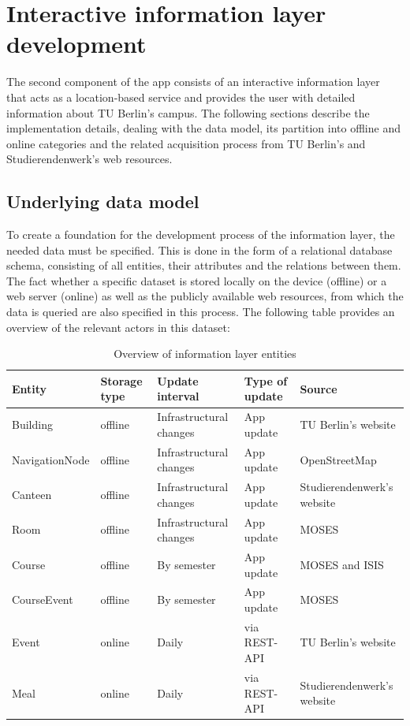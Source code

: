 \section{Interactive information layer development}
The second component of the app consists of an interactive information layer that acts as a location-based service and provides the user with detailed information about TU Berlin's campus. The following sections describe the implementation details, dealing with the data model, its partition into offline and online categories and the related acquisition process from TU Berlin's and Studierendenwerk's web resources. 

\subsection{Underlying data model}
To create a foundation for the development process of the information layer, the needed data must be specified. This is done in the form of a relational database schema, consisting of all entities, their attributes and the relations between them. The fact whether a specific dataset is stored locally on the device (offline) or a web server (online) as well as the publicly available web resources, from which the data is queried are also specified in this process. The following table provides an overview of the relevant actors in this dataset:

\begin{table}[!ht]
	\small
	\centering
	\begin{tabular}{|p{3cm}|p{1cm}|p{3.5cm}|p{2cm}|p{3.5cm}|}
		\hline
		\textbf{Entity}         & \textbf{Storage type} & \textbf{Update interval}      & \textbf{Type of update} 	& \textbf{Source}					 \\
		\hline
		Building	            & offline	            & Infrastructural changes       & App update 		& TU Berlin's website		 \\
		\hline
        NavigationNode          & offline	            & Infrastructural changes       & App update 		& OpenStreetMap  			 \\
		\hline
        Canteen                 & offline              	& Infrastructural changes       & App update 	    & Studierendenwerk's website \\
		\hline
		Room               		& offline              	& Infrastructural changes       & App update 		& MOSES			      		 \\
		\hline
		Course				    & offline              	& By semester                   & App update 		& MOSES	and ISIS		     \\
		\hline
		CourseEvent	    		& offline              	& By semester                   & App update 		& MOSES			             \\
		\hline
		Event		    		& online              	& Daily                         & via REST-API 	    & TU Berlin's website		 \\
		\hline
		Meal		    		& online              	& Daily                         & via REST-API 		& Studierendenwerk's website \\
		\hline
	\end{tabular}
	\caption{Overview of information layer entities}
\end{table}

